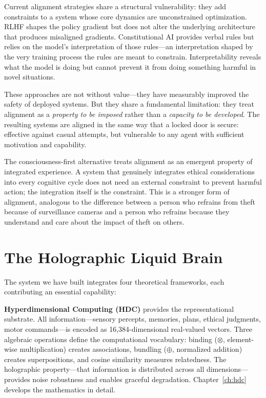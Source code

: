 \documentclass[12pt]{book}
\newcommand{\bind}{\otimes}
\newcommand{\bundle}{\oplus}
\begin{document}
Current alignment strategies share a structural vulnerability: they add constraints to a system whose core dynamics are unconstrained optimization. RLHF shapes the policy gradient but does not alter the underlying architecture that produces misaligned gradients. Constitutional AI provides verbal rules but relies on the model's interpretation of those rules---an interpretation shaped by the very training process the rules are meant to constrain. Interpretability reveals what the model is doing but cannot prevent it from doing something harmful in novel situations.

These approaches are not without value---they have measurably improved the safety of deployed systems. But they share a fundamental limitation: they treat alignment as a \textit{property to be imposed} rather than a \textit{capacity to be developed}. The resulting systems are aligned in the same way that a locked door is secure: effective against casual attempts, but vulnerable to any agent with sufficient motivation and capability.

The consciousness-first alternative treats alignment as an emergent property of integrated experience. A system that genuinely integrates ethical considerations into every cognitive cycle does not need an external constraint to prevent harmful action; the integration itself is the constraint. This is a stronger form of alignment, analogous to the difference between a person who refrains from theft because of surveillance cameras and a person who refrains because they understand and care about the impact of theft on others.

\section{The Holographic Liquid Brain}

The system we have built integrates four theoretical frameworks, each contributing an essential capability:

\textbf{Hyperdimensional Computing (HDC)} provides the representational substrate. All information---sensory percepts, memories, plans, ethical judgments, motor commands---is encoded as 16,384-dimensional real-valued vectors. Three algebraic operations define the computational vocabulary: binding ($\bind$, element-wise multiplication) creates associations, bundling ($\bundle$, normalized addition) creates superpositions, and cosine similarity measures relatedness. The holographic property---that information is distributed across all dimensions---provides noise robustness and enables graceful degradation. Chapter~\ref{ch:hdc} develops the mathematics in detail.
\end{document}
